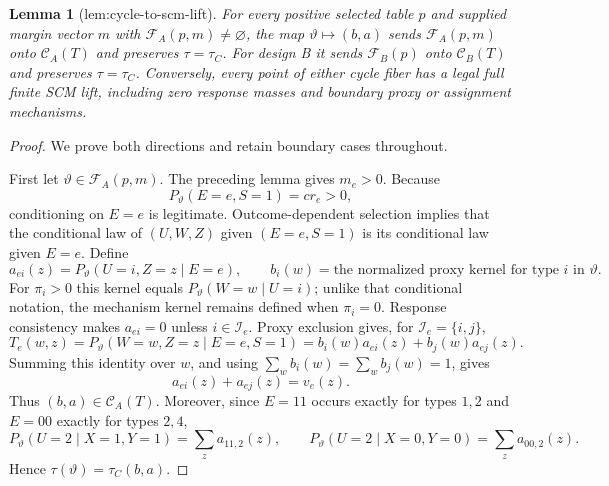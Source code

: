 \documentclass{article}
\newtheorem{lemma}{Lemma}
\begin{document}
\begin{lemma}[lem:cycle-to-scm-lift]\label{lem:cycle-to-scm-lift}
For every positive selected table \(p\) and supplied margin vector \(m\) with \(\mathcal F_A(p,m)\ne\varnothing\), the map \(\vartheta\mapsto(b,a)\) sends \(\mathcal F_A(p,m)\) onto \(\mathcal C_A(T)\) and preserves \(\tau=\tau_C\). For design B it sends \(\mathcal F_B(p)\) onto \(\mathcal C_B(T)\) and preserves \(\tau=\tau_C\). Conversely, every point of either cycle fiber has a legal full finite SCM lift, including zero response masses and boundary proxy or assignment mechanisms.
\end{lemma}
\begin{proof}
We prove both directions and retain boundary cases throughout.

First let \(\vartheta\in\mathcal F_A(p,m)\).  The preceding lemma gives \(m_e>0\).  Because
\[
P_{\vartheta}(E=e,S=1)=c r_e>0,
\]
conditioning on \(E=e\) is legitimate.  Outcome-dependent selection implies that the conditional law of \((U,W,Z)\) given \((E=e,S=1)\) is its conditional law given \(E=e\).  Define
\[
a_{ei}(z)=P_{\vartheta}(U=i,Z=z\mid E=e),
\qquad
b_i(w)=\text{the normalized proxy kernel for type }i\text{ in }\vartheta.
\]
For \(\pi_i>0\) this kernel equals \(P_{\vartheta}(W=w\mid U=i)\); unlike that conditional notation, the mechanism kernel remains defined when \(\pi_i=0\).
Response consistency makes \(a_{ei}=0\) unless \(i\in\mathcal I_e\).  Proxy exclusion gives, for \(\mathcal I_e=\{i,j\}\),
\[
T_e(w,z)
=P_{\vartheta}(W=w,Z=z\mid E=e,S=1)
=b_i(w)a_{ei}(z)+b_j(w)a_{ej}(z).
\]
Summing this identity over \(w\), and using \(\sum_w b_i(w)=\sum_wb_j(w)=1\), gives
\[
a_{ei}(z)+a_{ej}(z)=v_e(z).
\]
Thus \((b,a)\in\mathcal C_A(T)\).  Moreover, since \(E=11\) occurs exactly for types \(1,2\) and \(E=00\) exactly for types \(2,4\),
\[
P_{\vartheta}(U=2\mid X=1,Y=1)=\sum_z a_{11,2}(z),
\qquad
P_{\vartheta}(U=2\mid X=0,Y=0)=\sum_z a_{00,2}(z).
\]
Hence \(\tau(\vartheta)=\tau_C(b,a)\).


\end{proof}
\end{document}
